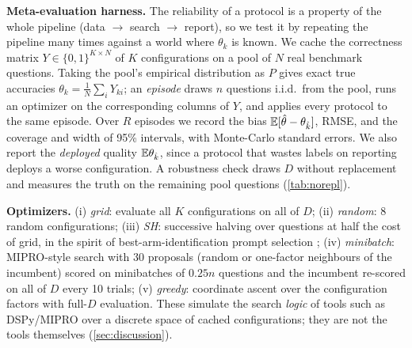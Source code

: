\textbf{Meta-evaluation harness.} The reliability of a protocol is a property of the whole pipeline (data $\to$ search $\to$ report), so we test it by repeating the pipeline many times against a world where $\theta_k$ is known. We cache the correctness matrix $Y\in\{0,1\}^{K\times N}$ of $K$ configurations on a pool of $N$ real benchmark questions. Taking the pool's empirical distribution as $P$ gives exact true accuracies $\theta_k=\frac1N\sum_i Y_{ki}$; an \emph{episode} draws $n$ questions i.i.d.\ from the pool, runs an optimizer on the corresponding columns of $Y$, and applies every protocol to the same episode. Over $R$ episodes we record the bias $\mathbb{E}[\hat\theta-\theta_{\hat k}]$, RMSE, and the coverage and width of 95\% intervals, with Monte-Carlo standard errors. We also report the \emph{deployed} quality $\mathbb{E}\theta_{\hat k}$, since a protocol that wastes labels on reporting deploys a worse configuration. A robustness check draws $D$ without replacement and measures the truth on the remaining pool questions (\cref{tab:norepl}).

\textbf{Optimizers.} (i) \emph{grid}: evaluate all $K$ configurations on all of $D$; (ii) \emph{random}: $8$ random configurations; (iii) \emph{SH}: successive halving over questions at half the cost of grid, in the spirit of best-arm-identification prompt selection \citep{shi2024efficient}; (iv) \emph{minibatch}: MIPRO-style \citep{opsahl2024optimizing} search with $30$ proposals (random or one-factor neighbours of the incumbent) scored on minibatches of $0.25n$ questions and the incumbent re-scored on all of $D$ every 10 trials; (v) \emph{greedy}: coordinate ascent over the configuration factors with full-$D$ evaluation. These simulate the search \emph{logic} of tools such as DSPy/MIPRO over a discrete space of cached configurations; they are not the tools themselves (\cref{sec:discussion}).
